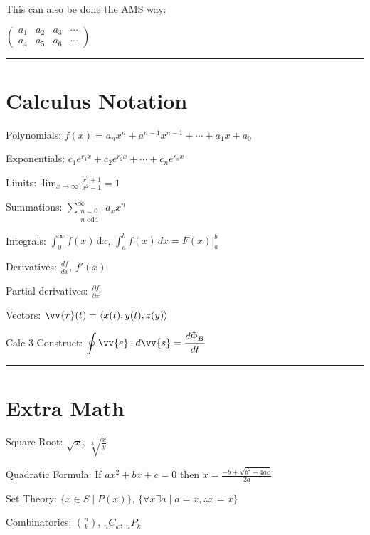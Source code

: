 \documentclass{article} %
\def \differential{\mathrm{d}x} %
\begin{document}
This can also be done the AMS way:

$\begin{pmatrix}
    a_{1} & a_{2} & a_{3} & \cdots \\
    a_{4} & a_{5} & a_{6} & \cdots 
\end{pmatrix}$

\noindent\rule{\textwidth}{1pt}

\section{Calculus Notation}
Polynomials:
\(\displaystyle f(x) = a_n x^n + a^{n-1} x^{n-1} + \cdots + a_1 x + a_0\)

Exponentials:
\(\displaystyle c_1 e^{r_1 x} + c_2 e^{r_2 x} + \cdots + c_n e^{r_n x}\)

Limits:
\(\displaystyle \lim_{x \to \infty} \frac{x^2 + 1}{x^2 - 1} = 1\)

Summations:
\(\displaystyle \sum_{\substack{n=0 \\ n \text{ odd }}}^{\infty} a_{x} x^n\)

Integrals:
\(\displaystyle \int_0^{\infty} f(x) \, \differential{}\), \(\displaystyle \int_a^b f(x) \, dx = F(x) \bigg\vert_a^b\)

Derivatives:
\(\displaystyle \frac{df}{dx}\), \(\displaystyle f'(x)\)

Partial derivatives:
\(\displaystyle \frac{\partial f}{\partial x}\)

Vectors: 
\(\displaystyle \vv{r}(t) = \langle x(t), y(t), z(y) \rangle\)

Calc 3 Construct:
\(\displaystyle \oint \vv{e} \cdot d\vv{s} = \dfrac{d\Phi_B}{dt}\)

\noindent\rule{\textwidth}{1pt}

\section{Extra Math}
Square Root:
\(\sqrt{x}\), \(\sqrt[3]{\frac{x}{y}}\)

Quadratic Formula:
If \(ax^2 + bx + c = 0\) then 
\(\displaystyle x = \frac{-b \pm \sqrt{b^2 - 4ac}}{2a}\)

Set Theory:
\(\{x \in S \mid P(x)\}\), \(\{\forall x \exists a \mid a = x, \therefore x = x\}\)

Combinatorics:
\(\displaystyle \binom{n}{k}\), \({}_nC_k\), \({}_nP_k\)
\end{document}
